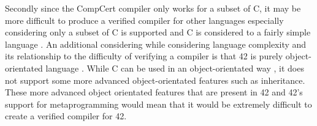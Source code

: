 \documentclass[11pt, a4paper, twoside, openright, twocolumn]{report}
\begin{document}
Secondly since the CompCert compiler only works for a subset of C, it may be more difficult to produce a verified compiler for other languages especially considering only a subset
of C is supported and C is considered to a fairly simple language \cite{Kernighan}. An additional considering while considering language complexity and its relationship to the difficulty of
verifying a compiler is that 42 is purely object-orientated language \cite{Servetto:L42}. While C can be used in an object-orientated way \cite{OOPinC}, it does not support some more advanced
object-orientated features such as inheritance. These more advanced object orientated features that are present in 42 and 42's support for metaprogramming would mean that it would
be extremely difficult to create a verified compiler for 42. 

\endgroup
\nocite{*}

%

\end{document}
